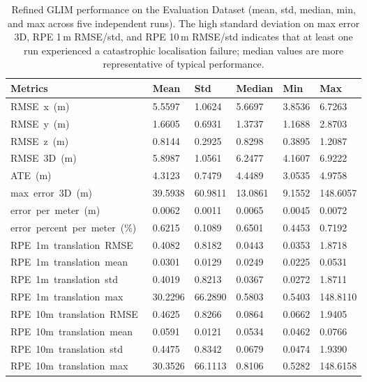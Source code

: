 \begin{table}[htbp]
\centering
\caption{Refined GLIM performance on the Evaluation Dataset (mean, std, median, min, and max across five independent runs). The high standard deviation on max error 3D, RPE 1\,m RMSE/std, and RPE 10\,m RMSE/std indicates that at least one run experienced a catastrophic localisation failure; median values are more representative of typical performance.}
\label{tab:eval_refined_performance}
\begin{tabularx}{\textwidth}{lXXXXX}
\toprule
\textbf{Metrics} & \textbf{Mean} & \textbf{Std} & \textbf{Median} & \textbf{Min} & \textbf{Max} \\ \midrule
RMSE\ x\ (m)\        & 5.5597  & 1.0624  & 5.6697  & 3.8536 & 6.7263   \\
RMSE\ y\ (m)\        & 1.6605  & 0.6931  & 1.3737  & 1.1688 & 2.8703   \\
RMSE\ z\ (m)\        & 0.8144  & 0.2925  & 0.8298  & 0.3895 & 1.2087   \\
RMSE\ 3D\ (m)\       & 5.8987  & 1.0561  & 6.2477  & 4.1607 & 6.9222   \\
ATE\ (m)\            & 4.3123  & 0.7479  & 4.4489  & 3.0535 & 4.9758   \\
max\ error\ 3D\ (m)\ & 39.5938 & 60.9811 & 13.0861 & 9.1552 & 148.6057 \\
error\ per\ meter\ (m)\        & 0.0062 & 0.0011 & 0.0065 & 0.0045 & 0.0072 \\
error\ percent\ per\ meter\ (\%)\ & 0.6215 & 0.1089 & 0.6501 & 0.4453 & 0.7192 \\
RPE\ 1m\ translation\ RMSE\  & 0.4082  & 0.8182  & 0.0443  & 0.0353 & 1.8718   \\
RPE\ 1m\ translation\ mean\  & 0.0301  & 0.0129  & 0.0249  & 0.0225 & 0.0531   \\
RPE\ 1m\ translation\ std\   & 0.4019  & 0.8213  & 0.0367  & 0.0272 & 1.8711   \\
RPE\ 1m\ translation\ max\   & 30.2296 & 66.2890 & 0.5803  & 0.5403 & 148.8110 \\
RPE\ 10m\ translation\ RMSE\ & 0.4625  & 0.8266  & 0.0864  & 0.0662 & 1.9405   \\
RPE\ 10m\ translation\ mean\ & 0.0591  & 0.0121  & 0.0534  & 0.0462 & 0.0766   \\
RPE\ 10m\ translation\ std\  & 0.4475  & 0.8342  & 0.0679  & 0.0474 & 1.9390   \\
RPE\ 10m\ translation\ max\  & 30.3526 & 66.1113 & 0.8106  & 0.5282 & 148.6158 \\ \bottomrule
\end{tabularx}
\end{table}

